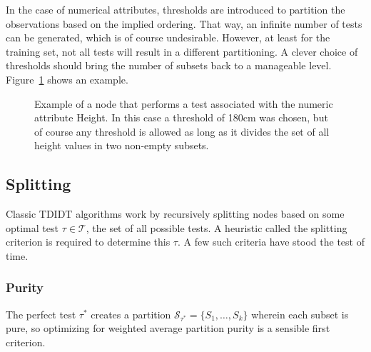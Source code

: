 In the case of numerical attributes, thresholds are introduced to partition the observations based on the implied ordering. That way, an infinite number of tests can be generated, which is of course undesirable. However, at least for the training set, not all tests will result in a different partitioning. A clever choice of thresholds should bring the number of subsets back to a manageable level. Figure~\ref{fig:numerical_split} shows an example.

\begin{figure}[htp]%
\label{fig:numerical_split}
\begin{center}
\end{center}
\caption{Example of a node that performs a test associated with the numeric attribute Height. In this case a threshold of 180cm was chosen, but of course any threshold is allowed as long as it divides the set of all height values in two non-empty subsets.}
\end{figure}


\subsection{Splitting}
Classic TDIDT algorithms work by recursively splitting nodes based on some optimal test $\tau \in \mathcal{T}$, the set of all possible tests. A heuristic called the splitting criterion is required to determine this $\tau$. A few such criteria have stood the test of time.

\subsubsection{Purity}
The perfect test $\tau^*$ creates a partition $\mathcal{S}_{\tau^*} = \{S_1, \ldots, S_k\}$ wherein each subset is pure, so optimizing for weighted average partition purity is a sensible first criterion.

